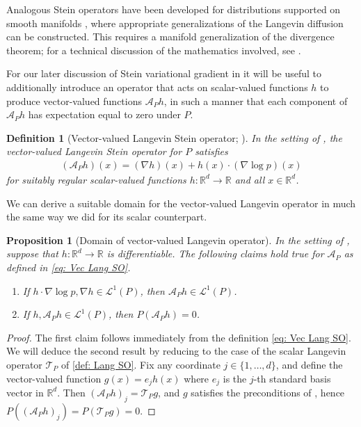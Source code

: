 \documentclass[12pt,paper=letter]{scrreprt}
\newtheorem{proposition}{Proposition}[chapter]
\newtheorem{definition}{Definition}[chapter]
\def\reals{\mathbb{R}} %
\newcommand{\grad}{\nabla} %
\newcommand{\TP}{\mathcal{T}_P}
\newcommand{\AP}{\mathcal{A}_P}
\newcommand{\Lp}[1][p]{\mathcal{L}^{#1}}
\begin{document}
Analogous Stein operators have been developed for distributions supported on smooth manifolds \citep{le2020diffusion,barp2022riemann}, where appropriate generalizations of the Langevin diffusion can be constructed.
This requires a manifold generalization of the divergence theorem; for a technical discussion of the mathematics involved, see \citet{pigola2014global}.

For our later discussion of Stein variational gradient in  it will be useful to additionally introduce an operator that acts on scalar-valued functions $h$ to produce vector-valued functions $\AP h$, in such a manner that each component of $\AP h$ has expectation equal to zero under $P$.

\begin{definition}[Vector-valued Langevin Stein operator; \citealp{liu2016kernelized}]
In the setting of , the \emph{vector-valued Langevin Stein operator} for $P$ satisfies
\begin{align}\label{eq: Vec Lang SO}
(\AP h)(x) = (\nabla h)(x) + h(x) \cdot (\nabla \log p)(x)
\end{align}
for suitably regular scalar-valued functions $h: \reals^d \to \reals$ and all $x \in \reals^d$.
\end{definition}

We can derive a suitable domain for the vector-valued Langevin operator in much the same way we did for its scalar counterpart.


\begin{proposition}[Domain of vector-valued Langevin operator] \label{lem: vector Stein op int by parts}
In the setting of , suppose that $h : \reals^d \rightarrow \reals$ is differentiable.
The following claims hold true for $\AP$ as defined in \cref{eq: Vec Lang SO}.
\begin{enumerate}
\item If $h \cdot \grad \log p, \grad h \in \Lp[1](P)$, then $\AP h \in \Lp[1](P)$.
\item If $h, \AP h \in \Lp[1](P)$, then $P(\AP h) = 0$. 
\end{enumerate}
\end{proposition}
\begin{proof}
The first claim follows immediately from the definition \cref{eq: Vec Lang SO}. 
We will deduce the second result by reducing to the case of the scalar Langevin operator $\TP$ of \cref{def: Lang SO}.
Fix any coordinate $j\in \{1 , \dots , d\}$, and define the vector-valued function $g(x) = e_j h(x)$ where $e_j$ is the $j$-th standard basis vector in $\reals^d$.  
Then $(\AP h)_j = \TP g$, and $g$ satisfies the preconditions of , hence $P((\AP h)_j) = P(\TP g) = 0$.
\end{proof}
\end{document}
